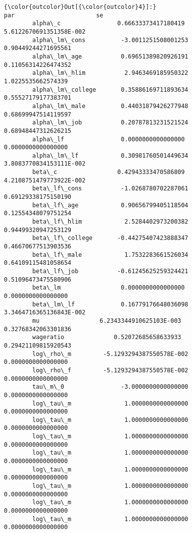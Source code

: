 \documentclass[11pt]{article}
\begin{document}
\begin{Verbatim}[commandchars=\\\{\}]
{\color{outcolor}Out[{\color{outcolor}4}]:}                                        par                       se
        alpha\_c                0.66633373417180419  5.6122670691351358E-002
        alpha\_lm\_cons          -3.0011251508001253      0.90449244271695561
        alpha\_lm\_age           0.69651389820926191      0.11056314226474352
        alpha\_lm\_hlim           2.9463469185950322       1.0225535662574339
        alpha\_lm\_college       0.35886169711893634      0.55527179177383701
        alpha\_lm\_male          0.44031879426277948      0.68699947514119597
        alpha\_lm\_job           0.20787813231521524      0.68948447312626215
        alpha\_lf                0.0000000000000000       0.0000000000000000
        alpha\_lm\_lf            0.30981760501449634  3.8083770834153111E-002
        beta\_c                 0.42943333470586809  4.2108751479773922E-002
        beta\_lf\_cons           -1.0268780702287061      0.69129338175150190
        beta\_lf\_age            0.90656799405118504      0.12554348079751254
        beta\_lf\_hlim            2.5284402973200382      0.94499320947253129
        beta\_lf\_college       -0.44275407423888347      0.46670677513903536
        beta\_lf\_male            1.7532283661526034      0.64109115481058654
        beta\_lf\_job           -0.61245625259324421      0.51096473475580906
        beta\_lm                 0.0000000000000000       0.0000000000000000
        beta\_lm\_lf             0.16779176648036098  3.3464716365136843E-002
        mu                 6.2343344910625103E-003      0.32768342063301836
        wageratio              0.52072685658633933      0.29421109815920543
        log\_rho\_m         -5.1293294387550578E-002       0.0000000000000000
        log\_rho\_f         -5.1293294387550578E-002       0.0000000000000000
        tau\_m\_0                -3.0000000000000000       0.0000000000000000
        log\_tau\_m               1.0000000000000000       0.0000000000000000
        log\_tau\_m               1.0000000000000000       0.0000000000000000
        log\_tau\_m               1.0000000000000000       0.0000000000000000
        log\_tau\_m               1.0000000000000000       0.0000000000000000
        log\_tau\_m               1.0000000000000000       0.0000000000000000
        log\_tau\_m               1.0000000000000000       0.0000000000000000
        log\_tau\_m               1.0000000000000000       0.0000000000000000
        log\_tau\_m               1.0000000000000000       0.0000000000000000

\end{Verbatim}
\end{document}
